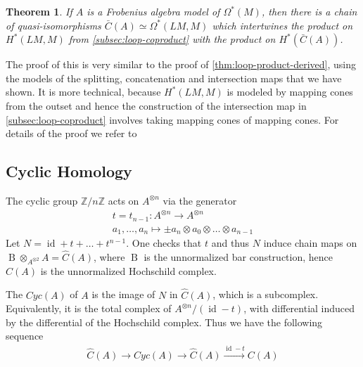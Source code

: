 \documentclass{scrartcl}
\let\emph\relax
\theoremstyle{plain}
\newtheorem{theorem}{Theorem}[section]
\theoremstyle{definition}
\newcommand{\Z}{\mathbb Z}
\newcommand{\quiso}{\simeq}
\let\xto\xrightarrow
\DeclareMathOperator{\id}{id}
\DeclareMathOperator{\Map}{Map}
\DeclareMathOperator{\BC}{B}
\begin{document}
\begin{theorem}{\cite[Thm. 1.3]{naef2019string}}
    If $A$ is a Frobenius algebra model of $\Omega^*(M)$, then there is a chain of quasi-isomorphisms $\bar C(A)\quiso \Omega^*(LM, M)$ which intertwines the product on $H^*(LM, M)$ from \cref{subsec:loop-coproduct} with the product on $H^*(\bar C(A))$.
\end{theorem}
The proof of this is very similar to the proof of \cref{thm:loop-product-derived}, using the models of the splitting, concatenation and intersection maps that we have shown. It is more technical, because $H^*(LM, M)$ is modeled by mapping cones from the outset and hence the construction of the intersection map in \cref{subsec:loop-coproduct} involves taking mapping cones of mapping cones. For details of the proof we refer to \cite[Sec. 6]{naef2019string}

\subsection{Cyclic Homology}
The cyclic group $\Z/n\Z$ acts on $A^{\otimes n}$ via the generator
\begin{align*}
    t=t_{n-1}\colon A^{\otimes n}\to A^{\otimes n} \\
    a_1, \dots, a_n \mapsto \pm a_n\otimes a_0\otimes\dots\otimes a_{n-1}
\end{align*}
Let $N = \id+t+\dots+t^{n-1}$. One checks that $t$ and thus $N$ induce chain maps on $\BC\otimes_{A^{\otimes 2}} A = \hat C(A)$, where $\BC$ is the unnormalized bar construction, hence $\hat C(A)$ is the unnormalized Hochschild complex. 

The \emph{cyclic complex} $Cyc(A)$ of $A$ is the image of $N$ in $\hat C(A)$, which is a subcomplex.  Equivalently, it is the total complex of $A^{\otimes n} / (\id-t)$, with differential induced by the differential of the Hochschild complex. 
Thus we have the following sequence
\begin{align*}
    \hat C(A) \to Cyc(A) \to \hat C(A) \xto{\id-t} C(A)
\end{align*}
\end{document}
